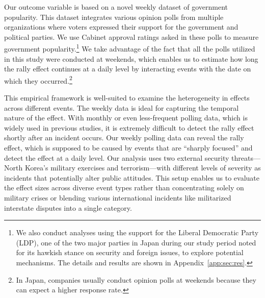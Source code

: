 \documentclass[letterpaper,12pt]{scrartcl}
\begin{document}
Our outcome variable is based on a novel weekly dataset of government popularity. This dataset integrates various opinion polls from multiple organizations where voters expressed their support for the government and political parties. We use Cabinet approval ratings asked in these polls to measure government popularity.\footnote{We also conduct analyses using the support for the Liberal Democratic Party (LDP), one of the two major parties in Japan during our study period noted for its hawkish stance on security and foreign issues, to explore potential mechanisms. The details and results are shown in Appendix~\ref{app:sec:res}.} We take advantage of the fact that all the polls utilized in this study were conducted at weekends, which enables us to estimate how long the rally effect continues at a daily level by interacting events with the date on which they occurred.\footnote{In Japan, companies usually conduct opinion polls at weekends because they can expect a higher response rate.}

This empirical framework is well-suited to examine the heterogeneity in effects across different events. The weekly data is ideal for capturing the temporal nature of the effect. With monthly or even less-frequent polling data, which is widely used in previous studies, it is extremely difficult to detect the rally effect shortly after an incident occurs. Our weekly polling data can reveal the rally effect, which is supposed to be caused by events that are ``sharply focused'' \citep[][p.~21]{Mueller1970APSR} and detect the effect at a daily level. Our analysis uses two external security threats---North Korea's military exercises and terrorism---with different levels of severity as incidents that potentially alter public attitudes. This setup enables us to evaluate the effect sizes across diverse event types rather than concentrating solely on military crises or blending various international incidents like militarized interstate disputes into a single category.
\end{document}
